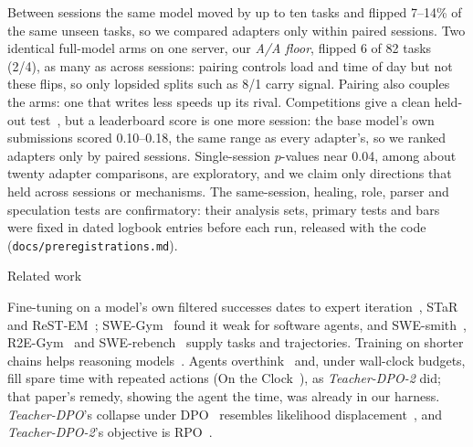 \documentclass[10pt,twocolumn]{article}
\makeatletter
\newcommand{\code}[1]{\texttt{\small #1}}
\newcommand{\ad}[1]{\textit{#1}}   %
\renewcommand\section{\@startsection{section}{1}{\z@}{-2.2ex \@plus -.6ex \@minus -.2ex}{1.1ex \@plus .2ex}%
  {\normalfont\large\bfseries}}
\makeatother
\begin{document}
Between sessions the same model moved by up to ten tasks and flipped 7--14\% of the same unseen tasks, so we compared
adapters only within paired sessions. Two
identical full-model arms on one server, our \emph{A/A floor}, flipped 6 of 82 tasks (2/4), as many as across
sessions: pairing controls load and time of day but not these flips, so only lopsided splits such as 8/1 carry signal.
Pairing also couples the arms: one that writes less speeds up its rival. Competitions give a clean held-out
test~\citep{sculley2025position}, but a leaderboard score is one more session: the base model's own submissions scored
0.10--0.18, the same range as every adapter's, so we ranked adapters only by paired sessions. Single-session $p$-values
near 0.04, among about twenty adapter comparisons, are exploratory, and we claim only directions that held across
sessions or mechanisms. The same-session, healing, role, parser and speculation tests are confirmatory: their analysis
sets, primary tests and bars were fixed in dated logbook entries before each run, released with the code
(\code{docs/preregistrations.md}).

\section{Related work}\label{sec:related}

Fine-tuning on a model's own filtered successes dates to expert iteration~\citep{anthony2017thinking},
STaR~\citep{zelikman2022star} and ReST-EM~\citep{singh2023beyond}; SWE-Gym~\citep{pan2024training} found it weak for
software agents, and SWE-smith~\citep{yang2025swesmith}, R2E-Gym~\citep{jain2025r2egym} and
SWE-rebench~\citep{badertdinov2025swerebench} supply tasks and trajectories. Training on shorter chains helps reasoning
models~\citep{hassid2025overthink}. Agents overthink~\citep{cuadron2025danger} and, under wall-clock budgets, fill
spare time with repeated actions (On the Clock~\citep{wang2026clock}), as \ad{Teacher-DPO-2} did; that paper's remedy,
showing the agent the time, was already in our harness. \ad{Teacher-DPO}'s collapse under DPO~\citep{rafailov2023direct}
resembles likelihood displacement~\citep{razin2024unintentional,pal2024smaug}, and \ad{Teacher-DPO-2}'s objective is
RPO~\citep{liu2024provably}.
\end{document}
